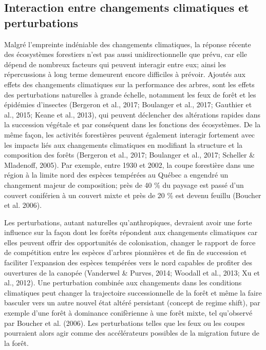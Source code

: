 \documentclass[
]{article}
\begin{document}
\hypertarget{interaction-entre-changements-climatiques-et-perturbations}{%
\subsection{Interaction entre changements climatiques et
perturbations}\label{interaction-entre-changements-climatiques-et-perturbations}}

Malgré l'empreinte indéniable des changements climatiques, la réponse
récente des écosystèmes forestiers n'est pas aussi unidirectionnelle que
prévu, car elle dépend de nombreux facteurs qui peuvent interagir entre
eux; ainsi les répercussions à long terme demeurent encore difficiles à
prévoir. Ajoutés aux effets des changements climatiques sur la
performance des arbres, sont les effets des perturbations naturelles à
grande échelle, notamment les feux de forêt et les épidémies d'insectes
(Bergeron et al., 2017; Boulanger et al., 2017; Gauthier et al., 2015;
Keane et al., 2013), qui peuvent déclencher des altérations rapides dans
la succession végétale et par conséquent dans les fonctions des
écosystèmes. De la même façon, les activités forestières peuvent
également interagir fortement avec les impacts liés aux changements
climatiques en modifiant la structure et la composition des forêts
(Bergeron et al., 2017; Boulanger et al., 2017; Scheller \& Mladenoff,
2005). Par exemple, entre 1930 et 2002, la coupe forestière dans une
région à la limite nord des espèces tempérées au Québec a engendré un
changement majeur de composition; près de 40 \% du paysage est passé
d'un couvert coniférien à un couvert mixte et près de 20 \% est devenu
feuillu (Boucher et al. 2006).

Les perturbations, autant naturelles qu'anthropiques, devraient avoir
une forte influence sur la façon dont les forêts répondent aux
changements climatiques car elles peuvent offrir des opportunités de
colonisation, changer le rapport de force de compétition entre les
espèces d'arbres pionnières et de fin de succession et faciliter
l'expansion des espèces tempérées vers le nord capables de profiter des
ouvertures de la canopée (Vanderwel \& Purves, 2014; Woodall et al.,
2013; Xu et al., 2012). Une perturbation combinée aux changements dans
les conditions climatiques peut changer la trajectoire successionnelle
de la forêt et même la faire basculer vers un autre nouvel état altéré
persistant (concept de regime shift), par exemple d'une forêt à
dominance conifèrienne à une forêt mixte, tel qu'observé par Boucher et
al. (2006). Les perturbations telles que les feux ou les coupes
pourraient alors agir comme des accélérateurs possibles de la migration
future de la forêt.
\end{document}
